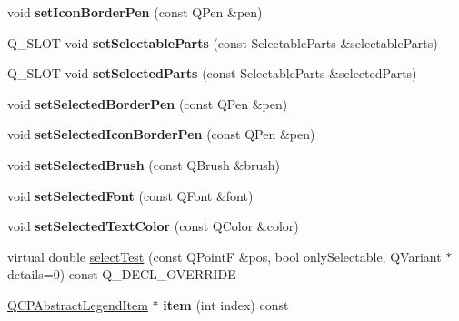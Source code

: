 \begin{DoxyCompactItemize}
\item 
void {\bfseries set\+Icon\+Border\+Pen} (const Q\+Pen \&pen)\hypertarget{class_q_c_p_legend_a2f2c93d18a651f4ff294bb3f026f49b8}{}\label{class_q_c_p_legend_a2f2c93d18a651f4ff294bb3f026f49b8}

\item 
Q\+\_\+\+S\+L\+OT void {\bfseries set\+Selectable\+Parts} (const Selectable\+Parts \&selectable\+Parts)\hypertarget{class_q_c_p_legend_a41a37b92c3af6e48a072eb365bff9a04}{}\label{class_q_c_p_legend_a41a37b92c3af6e48a072eb365bff9a04}

\item 
Q\+\_\+\+S\+L\+OT void {\bfseries set\+Selected\+Parts} (const Selectable\+Parts \&selected\+Parts)\hypertarget{class_q_c_p_legend_a93276fc99fec3c75b25b673a43e33473}{}\label{class_q_c_p_legend_a93276fc99fec3c75b25b673a43e33473}

\item 
void {\bfseries set\+Selected\+Border\+Pen} (const Q\+Pen \&pen)\hypertarget{class_q_c_p_legend_a2c35d262953a25d96b6112653fbefc88}{}\label{class_q_c_p_legend_a2c35d262953a25d96b6112653fbefc88}

\item 
void {\bfseries set\+Selected\+Icon\+Border\+Pen} (const Q\+Pen \&pen)\hypertarget{class_q_c_p_legend_ade93aabe9bcccaf9cf46cec22c658027}{}\label{class_q_c_p_legend_ade93aabe9bcccaf9cf46cec22c658027}

\item 
void {\bfseries set\+Selected\+Brush} (const Q\+Brush \&brush)\hypertarget{class_q_c_p_legend_a875227f3219c9799464631dec5e8f1bd}{}\label{class_q_c_p_legend_a875227f3219c9799464631dec5e8f1bd}

\item 
void {\bfseries set\+Selected\+Font} (const Q\+Font \&font)\hypertarget{class_q_c_p_legend_ab580a01c3c0a239374ed66c29edf5ad2}{}\label{class_q_c_p_legend_ab580a01c3c0a239374ed66c29edf5ad2}

\item 
void {\bfseries set\+Selected\+Text\+Color} (const Q\+Color \&color)\hypertarget{class_q_c_p_legend_a7674dfc7a1f30e1abd1018c0ed45e0bc}{}\label{class_q_c_p_legend_a7674dfc7a1f30e1abd1018c0ed45e0bc}

\item 
virtual double \hyperlink{class_q_c_p_legend_a9dc868bd95069fad9f40718b7715e100}{select\+Test} (const Q\+PointF \&pos, bool only\+Selectable, Q\+Variant $\ast$details=0) const Q\+\_\+\+D\+E\+C\+L\+\_\+\+O\+V\+E\+R\+R\+I\+DE
\item 
\hyperlink{class_q_c_p_abstract_legend_item}{Q\+C\+P\+Abstract\+Legend\+Item} $\ast$ {\bfseries item} (int index) const \hypertarget{class_q_c_p_legend_a4541295effb286eb78e637962c418190}{}\label{class_q_c_p_legend_a4541295effb286eb78e637962c418190}


\end{DoxyCompactItemize}
